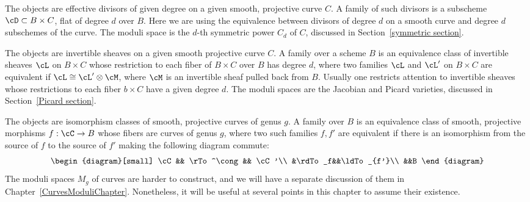 
\begin{example} The objects are
%
%
effective divisors of given degree on a given smooth, projective curve
$C$. A family of such divisors is a subscheme $\cD \subset B \times C$,
flat of degree $d$ over $B$.
Here we are using
the equivalence between divisors of degree $d$ on a smooth curve and
degree $d$ subschemes of the curve. The moduli space is the $d$-th
symmetric power
%
$C_d$ of $C$, discussed in Section~\ref{symmetric section}.
\end{example}

\begin{example} The objects are
%
invertible sheaves on a given smooth projective curve $C$. A family
over a scheme $B$ is an equivalence class of invertible sheaves $\cL$
on $B \times C$ whose restriction to each fiber of $B \times C$ over
$B$ has degree $d$, where two families $\cL$ and $\cL'$ on $B \times
C$ are equivalent if $\cL\cong \cL' \otimes \cM$, where $\cM$ is  an
invertible sheaf pulled back from $B$. Usually one restricts attention
to invertible sheaves
whose restrictions to each fiber $b\times C$ have a given degree $d$.
%
%
The moduli spaces are the Jacobian and Picard varieties,
discussed in
Section~\ref{Picard section}.
\end{example}

\begin{example} The objects are isomorphism
%
classes of smooth, projective curves of genus $g$. A family over $B$
is an equivalence class of smooth, projective morphisms $f : \cC \to B$
whose fibers are curves of genus $g$, where two such families $f, f'$
are equivalent if there is an isomorphism from the source of $f$ to
the source
of $f'$ making the
following diagram commute:
$$
\begin{diagram}[small]
\cC && \rTo^\cong && \cC'\\
&\rdTo_f&&\ldTo_{f'}\\
&&B
\end{diagram}
\vspace*{3pt}
$$
The moduli spaces $M_g$ of curves are harder to construct, and we will
have a separate discussion of them in
Chapter~\ref{CurvesModuliChapter}. Nonetheless,
it will be useful at several points in this chapter to assume their
existence.
\end{example}

